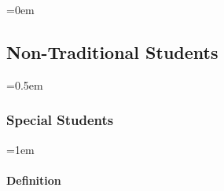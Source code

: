 \documentclass{manual}
\newcommand{\modified}[1]{}
\let\oldsubsection\subsection
\renewcommand\subsection{\leftskip=0em\oldsubsection}
\let\oldsubsubsection\subsubsection
\renewcommand\subsubsection{\leftskip=0.5em\oldsubsubsection}
\let\oldparagraph\paragraph
\renewcommand\paragraph{\leftskip=1em\oldparagraph}
\begin{document}
\subsection{Non-Traditional Students}\label{sec:NonTraditionalStudents}


%
%
%
%
%
%
%
%

\subsubsection{Special Students}\label{sub:SpecialStudents}


\paragraph{Definition}
\end{document}
